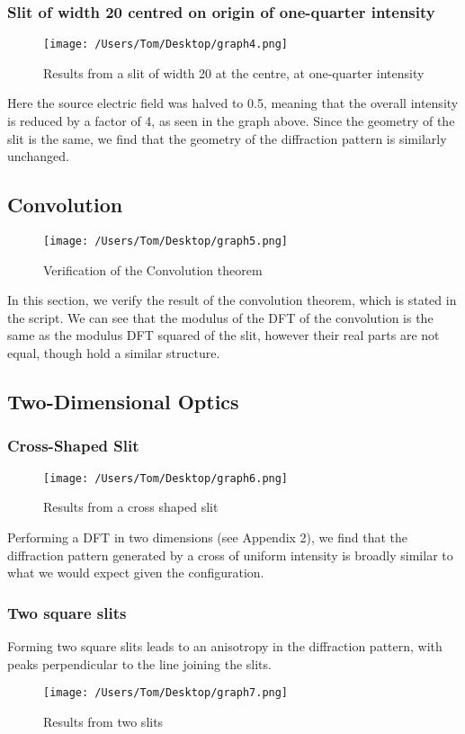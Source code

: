 \documentclass[a4paper,11pt]{article}
\begin{document}
\subsubsection{Slit of width 20 centred on origin of one-quarter intensity}
\begin{figure}[h!]
  \texttt{[image: /Users/Tom/Desktop/graph4.png]}
  \caption{Results from a slit of width 20 at the centre, at one-quarter intensity}
  \label{fig:graph1}
\end{figure}
Here the source electric field was halved to 0.5, meaning that the overall intensity is reduced by a factor of 4, as seen in the graph above. Since the geometry of the slit is the same, we find that the geometry of the diffraction pattern is similarly unchanged.
\pagebreak
\subsection{Convolution}
\begin{figure}[h!]
  \texttt{[image: /Users/Tom/Desktop/graph5.png]}
  \caption{Verification of the Convolution theorem}
  \label{fig:graph1}
\end{figure}
In this section, we verify the result of the convolution theorem, which is stated in the script\cite{script}. We can see that the modulus of the DFT of the convolution is the same as the modulus DFT squared of the slit, however their real parts are not equal, though hold a similar structure. 
\pagebreak
\subsection{Two-Dimensional Optics}
\subsubsection{Cross-Shaped Slit}
\begin{figure}[h!]
  \texttt{[image: /Users/Tom/Desktop/graph6.png]}
  \caption{Results from a cross shaped slit}
  \label{fig:graph1}
\end{figure}
Performing a DFT in two dimensions (see Appendix 2), we find that the diffraction pattern generated by a cross of uniform intensity is broadly similar to what we would expect given the configuration.
\subsubsection{Two square slits}
\noindent Forming two square slits leads to an anisotropy in the diffraction pattern, with peaks perpendicular to the line joining the slits.
\begin{figure}[h!]
  \texttt{[image: /Users/Tom/Desktop/graph7.png]}
  \caption{Results from two slits}
  \label{fig:graph1}
\end{figure}
\end{document}
